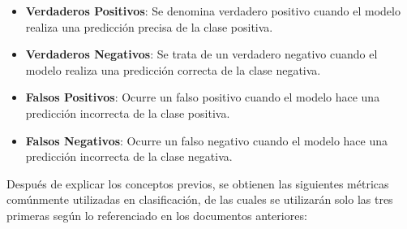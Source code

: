 \begin{itemize}
    \item \textbf{Verdaderos Positivos}: Se denomina verdadero positivo cuando el modelo realiza una predicción precisa de la clase positiva.
    \item \textbf{Verdaderos Negativos}: Se trata de un verdadero negativo cuando el modelo realiza una predicción correcta de la clase negativa.
    \item \textbf{Falsos Positivos}: Ocurre un falso positivo cuando el modelo hace una predicción incorrecta de la clase positiva. 
    \item \textbf{Falsos Negativos}: Ocurre un falso negativo cuando el modelo hace una predicción incorrecta de la clase negativa. 
    \end{itemize}

    Después de explicar los conceptos previos, se obtienen las siguientes métricas comúnmente utilizadas en clasificación, de las cuales se utilizarán solo las tres primeras según lo referenciado en los documentos anteriores:

